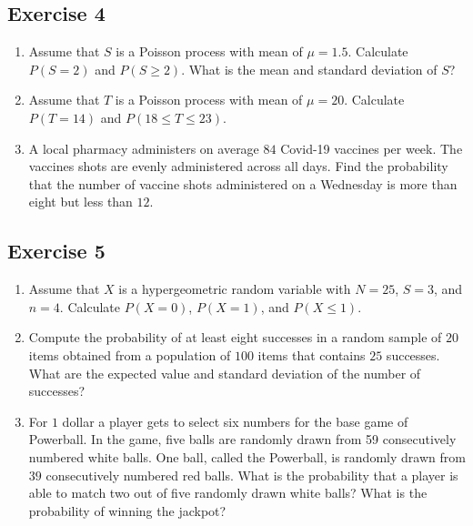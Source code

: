\documentclass[
  letterpaper,
  DIV=11,
  numbers=noendperiod]{scrreprt}
\begin{document}
\hypertarget{exercise-4-8}{%
\subsection*{Exercise 4}\label{exercise-4-8}}

\begin{enumerate}
\def\labelenumi{\arabic{enumi}.}
\item
  Assume that \(S\) is a Poisson process with mean of \(\mu=1.5\).
  Calculate \(P(S=2)\) and \(P(S \geq 2)\). What is the mean and
  standard deviation of \(S\)?
\item
  Assume that \(T\) is a Poisson process with mean of \(\mu=20\).
  Calculate \(P(T=14)\) and \(P(18 \leq T \leq 23)\).
\item
  A local pharmacy administers on average \(84\) Covid-19 vaccines per
  week. The vaccines shots are evenly administered across all days. Find
  the probability that the number of vaccine shots administered on a
  Wednesday is more than eight but less than \(12\).
\end{enumerate}

\hypertarget{exercise-5-2}{%
\subsection*{Exercise 5}\label{exercise-5-2}}

\begin{enumerate}
\def\labelenumi{\arabic{enumi}.}
\item
  Assume that \(X\) is a hypergeometric random variable with \(N=25\),
  \(S=3\), and \(n=4\). Calculate \(P(X=0)\), \(P(X=1)\), and
  \(P(X \leq 1)\).
\item
  Compute the probability of at least eight successes in a random sample
  of \(20\) items obtained from a population of \(100\) items that
  contains \(25\) successes. What are the expected value and standard
  deviation of the number of successes?
\item
  For \(1\) dollar a player gets to select six numbers for the base game
  of Powerball. In the game, five balls are randomly drawn from 59
  consecutively numbered white balls. One ball, called the Powerball, is
  randomly drawn from \(39\) consecutively numbered red balls. What is
  the probability that a player is able to match two out of five
  randomly drawn white balls? What is the probability of winning the
  jackpot?
\end{enumerate}
\end{document}
